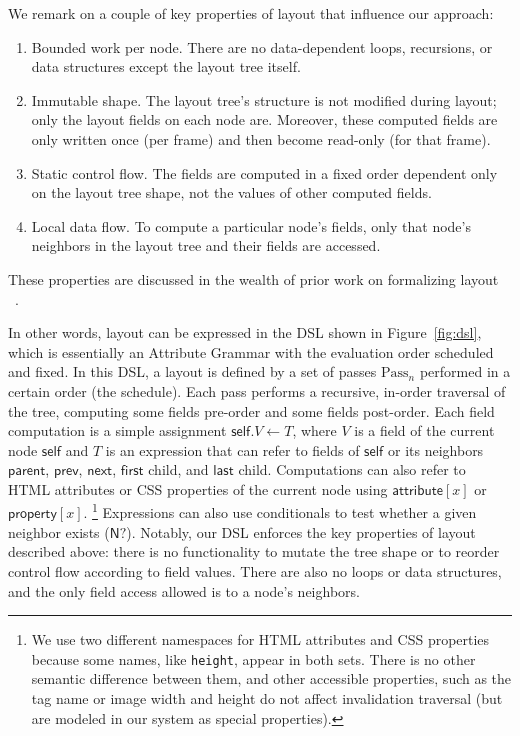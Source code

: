 We remark on a couple of key properties of layout
  that influence our approach:
\begin{enumerate}
\item Bounded work per node. There are no
  data-dependent loops, recursions, or data structures
  except the layout tree itself.
\item Immutable shape. The layout tree's structure
  is not modified during layout;
  only the layout fields on each node are.
Moreover, these computed fields
  are only written once (per frame)
  and then become read-only (for that frame).
\item Static control flow.
  The fields are computed in a fixed order
    dependent only on the layout tree shape,
    not the values of other computed fields.
\item Local data flow.
  To compute a particular node's fields,
    only that node's neighbors in the layout tree
    and their fields are accessed.
\end{enumerate}
These properties are discussed in
  the wealth of prior work on formalizing layout%
  ~\cite{meyerovich-1,meyerovich-2,meyerovich-3,cassius-1,cassius-2,cassius-3,yufeng-1,yufeng-2}.

In other words, layout can be expressed in the DSL
  shown in Figure~\ref{fig:dsl}, which is essentially an Attribute Grammar with the evaluation order scheduled and fixed.
In this DSL, a layout is defined by a set of passes
  $\text{Pass}_n$ performed in a certain order (the schedule).
Each pass performs a recursive, in-order traversal of the tree,
  computing some fields pre-order and some fields post-order.
Each field computation is a simple assignment $\mathsf{self}.V \gets T$,
  where $V$ is a field of the current node $\mathsf{self}$
  and $T$ is an expression that can refer to
  fields of $\mathsf{self}$ or its neighbors
  $\mathsf{parent}$, $\mathsf{prev}$, $\mathsf{next}$,
  $\mathsf{first}$ child, and $\mathsf{last}$ child.
Computations can also refer to HTML attributes or CSS properties
  of the current node
  using $\mathsf{attribute}[x]$ or $\mathsf{property}[x]$.%
\footnote{
We use two different namespaces
  for HTML attributes and CSS properties
  because some names, like \texttt{height},
  appear in both sets.
There is no other semantic difference between them,
  and other accessible properties,
  such as the tag name or image width and height
  do not affect invalidation traversal
  (but are modeled in our system as special properties).
}
Expressions can also use conditionals
  to test whether a given neighbor exists ($\mathsf{N?}$).
Notably, our DSL enforces
  the key properties of layout described above:
  there is no functionality to mutate the tree shape
  or to reorder control flow according to field values.
There are also no loops or data structures,
  and the only field access allowed is to a node's neighbors.

